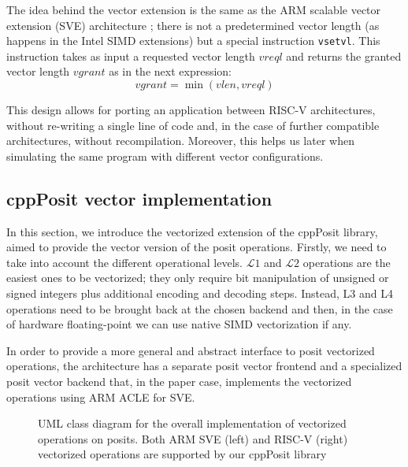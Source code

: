 The idea behind the vector extension is the same as the ARM scalable vector extension (SVE) architecture \cite{armintr}; there is not a predetermined vector length (as happens in the Intel SIMD extensions) but a special instruction \texttt{vsetvl}. This instruction takes as input a requested vector length $vreql$ and returns the granted vector length $vgrant$ as in the next expression:
\begin{equation*} %
    vgrant = \min\left(vlen,vreql\right)
\end{equation*}

This design allows for porting an application between RISC-V architectures, without re-writing a single line of code and, in the case of further compatible architectures, without recompilation. Moreover, this helps us later when simulating the same program with different vector configurations.

\subsection{cppPosit vector implementation}

In this section, we introduce the vectorized extension of the cppPosit library, aimed to provide the vector version of the posit operations. Firstly, we need to take into account the  different operational levels. $\mathcal{L}1$ and $\mathcal{L}2$ operations are the easiest ones to be vectorized; they only require bit manipulation of unsigned or signed integers plus additional encoding and decoding steps. Instead, L3 and L4 operations need to be brought back at the chosen backend and then, in the case of hardware floating-point we can use native SIMD vectorization if any.

In order to provide a more general and abstract interface to posit vectorized operations, the architecture has a separate posit vector frontend and a specialized posit vector backend that, in the paper case, implements the vectorized operations using ARM ACLE for SVE.

\begin{figure}
\centering
{}

\caption{UML class diagram for the overall implementation of vectorized operations on posits. Both ARM SVE (left) and RISC-V (right) vectorized operations are supported by our cppPosit library}
\label{fig:cppPositvect}
\end{figure}

